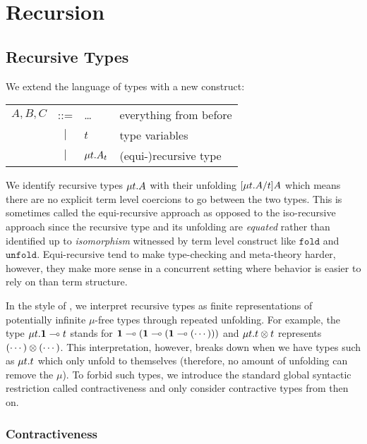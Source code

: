 
\section{Recursion}

\subsection{Recursive Types}

We extend the language of types with a new construct:
\begin{center}
\begin{tabular}{l c l l}
  $A, B, C$ & ::= & \ldots               & everything from before \\
            & $|$ & $t$                  & type variables \\
            & $|$ & $\mu{t} . {A_t}$ & (equi-)recursive type
\end{tabular}
\end{center}

We identify recursive types $\mu{t} . {A}$ with their unfolding $\lbrack{\mu{t} . {A}}/{t}\rbrack{A}$ which means there are no explicit term level coercions to go between the two types. This is sometimes called the equi-recursive approach as opposed to the iso-recursive approach since the recursive type and its unfolding are \emph{equated} rather than identified up to \emph{isomorphism} witnessed by term level construct like  $\mathtt{fold}$ and $\mathtt{unfold}$. Equi-recursive tend to make type-checking and meta-theory harder, however, they make more sense in a concurrent setting where behavior is easier to rely on than term structure. 

In the style of \cite{AmadioC91}, we interpret recursive types as finite representations of potentially infinite $\mu$-free types through repeated unfolding. For example, the type $\mu{t} . {\mathbf{1} \multimap t}$ stands for $\mathbf{1} \multimap (\mathbf{1} \multimap (\mathbf{1} \multimap (\cdots )))$ and $\mu{t} . {t \otimes t}$ represents $(\cdots) \otimes (\cdots)$. This interpretation, however, breaks down when we have types such as $\mu{t} . {t}$ which only unfold to themselves (therefore, no amount of unfolding can remove the $\mu$). To forbid such types, we introduce the standard global syntactic restriction called contractiveness and only consider contractive types from then on.


\subsubsection{Contractiveness}

